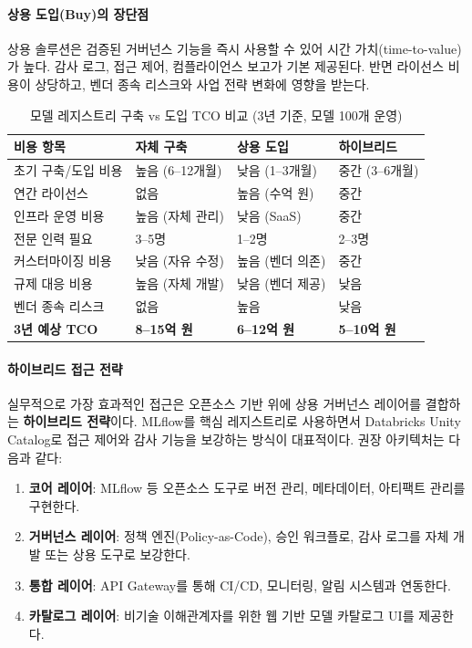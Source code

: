 \paragraph{상용 도입(Buy)의 장단점}

상용 솔루션은 검증된 거버넌스 기능을 즉시 사용할 수 있어 시간 가치(time-to-value)가 높다. 감사 로그, 접근 제어, 컴플라이언스 보고가 기본 제공된다. 반면 라이선스 비용이 상당하고, 벤더 종속 리스크와 사업 전략 변화에 영향을 받는다.

\begin{table}[htbp]
\centering
\caption{모델 레지스트리 구축 vs 도입 TCO 비교 (3년 기준, 모델 100개 운영)}
\label{tab:14_4}
\begin{tabularx}{\textwidth}{lXXX}
\toprule
\textbf{비용 항목} & \textbf{자체 구축} & \textbf{상용 도입} & \textbf{하이브리드} \\
\midrule
초기 구축/도입 비용 & 높음 (6--12개월) & 낮음 (1--3개월) & 중간 (3--6개월) \\
연간 라이선스 & 없음 & 높음 (수억 원) & 중간 \\
인프라 운영 비용 & 높음 (자체 관리) & 낮음 (SaaS) & 중간 \\
전문 인력 필요 & 3--5명 & 1--2명 & 2--3명 \\
커스터마이징 비용 & 낮음 (자유 수정) & 높음 (벤더 의존) & 중간 \\
규제 대응 비용 & 높음 (자체 개발) & 낮음 (벤더 제공) & 낮음 \\
벤더 종속 리스크 & 없음 & 높음 & 낮음 \\
\midrule
\textbf{3년 예상 TCO} & \textbf{8--15억 원} & \textbf{6--12억 원} & \textbf{5--10억 원} \\
\bottomrule
\end{tabularx}
\end{table}

\paragraph{하이브리드 접근 전략}

실무적으로 가장 효과적인 접근은 오픈소스 기반 위에 상용 거버넌스 레이어를 결합하는 \textbf{하이브리드 전략}이다. MLflow를 핵심 레지스트리로 사용하면서 Databricks Unity Catalog로 접근 제어와 감사 기능을 보강하는 방식이 대표적이다. 권장 아키텍처는 다음과 같다:

\begin{enumerate}
  \item \textbf{코어 레이어}: MLflow 등 오픈소스 도구로 버전 관리, 메타데이터, 아티팩트 관리를 구현한다.
  \item \textbf{거버넌스 레이어}: 정책 엔진(Policy-as-Code\cite{stix2021actionable}), 승인 워크플로, 감사 로그를 자체 개발 또는 상용 도구로 보강한다.
  \item \textbf{통합 레이어}: API Gateway를 통해 CI/CD, 모니터링, 알림 시스템과 연동한다.
  \item \textbf{카탈로그 레이어}: 비기술 이해관계자를 위한 웹 기반 모델 카탈로그 UI를 제공한다.
\end{enumerate}

